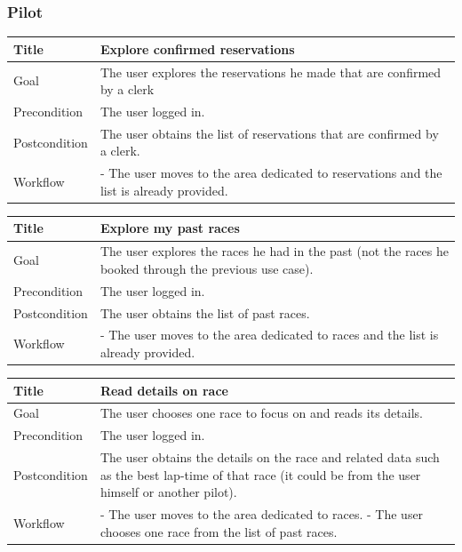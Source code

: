 \documentclass{beamer}
\begin{document}
\begin{frame}
    \frametitle{Pilot}
    \begin{table}
        \tiny
        \begin{tabular}{|p{2cm}|p{6cm}|}
        \hline
        Title & \textbf{Explore confirmed reservations} \\
        \hline
        Goal & The user explores the reservations he made that are confirmed by a clerk \\
        \hline
        Precondition & The user logged in. \\
        \hline
        Postcondition & The user obtains the list of reservations that are confirmed by a clerk. \\
        \hline
        Workflow &
        - The user moves to the area dedicated to reservations and the list is already provided. \\
        \hline
        \end{tabular}
\end{table}

\begin{table}
    \tiny
    \begin{tabular}{|p{2cm}|p{6cm}|}
    \hline
    Title & \textbf{Explore my past races} \\
    \hline
    Goal & The user explores the races he had in the past (not the races he booked through the previous 
    use case). \\
    \hline
    Precondition & The user logged in. \\
    \hline  
    Postcondition & The user obtains the list of past races. \\
    \hline
    Workflow &
    - The user moves to the area dedicated to races
    and the list is already provided. \\
    \hline
    \end{tabular}
\end{table}

\begin{table}
    \tiny
    \begin{tabular}{|p{2cm}|p{6cm}|}
    \hline
    Title & \textbf{Read details on race} \\
    \hline
    Goal & The user chooses one race to focus on and reads its details. \\
    \hline
    Precondition & The user logged in. \\
    \hline
    Postcondition & The user obtains the details on the race and related data such as the best lap-time of
    that race (it could be from the user himself or another pilot). \\
    \hline
    Workflow &
    - The user moves to the area dedicated to races. \newline
    - The user chooses one race from the list of past races. \\
    \hline
    \end{tabular}
\end{table}

\end{frame}
\end{document}
